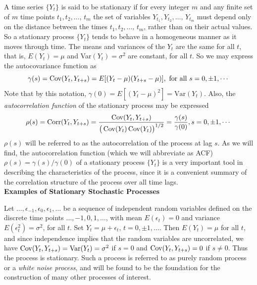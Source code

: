 A time series $\{Y_t\}$ is said to be stationary if for every integer $m$ and any finite set of $m$ time points $t_1, t_2, \ldots, \, t_m$ the set of variables $Y_{t_1}, Y_{t_2}, \ldots, \, Y_{t_m}$ must depend only on the distance between the times $t_1, t_2, \ldots, \, t_m$, rather than on their actual values.  So a stationary process $\{Y_t\}$ tends to behave in a homogeneous manner as it moves through time. The means and variances of the $Y_t$ are the same for all $t$, that is, $E\left(Y_t\right) = \mu$ and  Var$\left(Y_t\right)=\sigma^2$ are constant, for all $t$. So we may express the autocovariance function as 
	\begin{equation}\label{eqn:2gammas}
	\gamma(s)=\Cov(Y_t,Y_{t+s})=E[(Y_t-\mu)(Y_{t+s}-\mu)], \text{ for all }s=0,\pm 1,\cdots
	\end{equation}
Note that by this notation, $\gamma(0) = E[(Y_t-\mu)^2] = \text{Var}(Y_t)$. Also, the \textit{autocorrelation function} of the stationary process may be expressed
        	\begin{equation}\label{eqn:2rhos}
	\rho(s)=\Corr(Y_t,Y_{t+s})= \dfrac{\Cov(Y_t,Y_{t+s})}{\big(\Cov(Y_t)\Cov(Y_t)\big)^{1/2}} = \dfrac{\gamma(s)}{\gamma(0)},  s=0,\pm 1,\cdots
	\end{equation}
$\rho(s)$ will be referred to as the autocorrelation of the process at lag $s$. As we will find, the autocorrelation function (which we will abbreviate as ACF) $\rho(s) = \gamma(s)/\gamma(0)$ of a stationary process $\{Y_t\}$ is a very important tool in describing the characteristics of the process, since it is a convenient summary of the correlation structure of the process over all time lags.  \\


\noindent \textbf{Examples of Stationary Stochastic Processes} 


\begin{ex} \label{ex:whitenoise} Let $\ldots, \epsilon_{-1}, \epsilon_0, \epsilon_1, \ldots$ be a sequence of independent random variables defined on the discrete time points $\ldots,-1,0,1,\ldots$, with mean $E(\epsilon_{t})=0$ and variance $E(\epsilon_{t}^2)=\sigma^2$, for all $t$. Set $Y_t = \mu + \epsilon_t, \, t=0, \pm1, \ldots$. Then $E(Y_t)=\mu$ for all $t$, and since independence implies that the random variables are uncorrelated, we have $\operatorname{Cov}(Y_t,Y_{t+s})=\operatorname{Var}(Y_t)=\sigma^2$ if $s=0$ and $\operatorname{Cov}(Y_t,Y_{t+s})=0$ if $s\neq0$. Thus the process is stationary. Such a process is referred to as purely random process or a \textit{white noise process}, and will be found to be the foundation for the construction of many other processes of interest. 
\end{ex}


